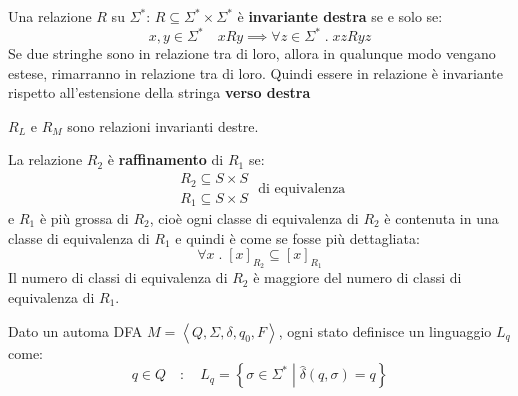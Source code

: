 \documentclass[a4paper]{article}
\begin{document}
\vspace{1em}
\noindent
\begin{definition}
  Una relazione \( R \) su \( \Sigma^* \): \( R \subseteq \Sigma^* \times \Sigma^* \) 
  è \textbf{invariante destra} se e solo se:
  \[
    x,y \in \Sigma^* \quad xRy \implies \forall z \in \Sigma^* \;.\; xz R yz
  \] 
  Se due stringhe sono in relazione tra di loro, allora in qualunque modo vengano
  estese, rimarranno in relazione tra di loro.
  Quindi essere in relazione è invariante rispetto all'estensione della stringa
  \textbf{verso destra}

  \vspace{1em}
  \noindent
  \( R_L \) e \( R_M \) sono relazioni invarianti destre.
\end{definition}

\begin{definition}[Raffinamento]
  La relazione \( R_2 \) è \textbf{raffinamento} di \( R_1 \) se:
  \[
    \begin{array}{ll}
      R_2 \subseteq S \times S \\
      R_1 \subseteq S \times S
    \end{array}
    \text{ di equivalenza}
  \] 
  e \( R_1 \) è più grossa di \( R_2 \), cioè ogni classe di equivalenza di \( R_2 \)
  è contenuta in una classe di equivalenza di \( R_1 \) e quindi è come se fosse
  più dettagliata:
  \[
    \forall x \;.\; [x]_{R_2} \subseteq [x]_{R_1}
  \] 
  Il numero di classi di equivalenza di \( R_2 \) è maggiore del numero di classi
  di equivalenza di \( R_1 \).
\end{definition}

\begin{definition}
  Dato un automa DFA \( M = \left< Q, \Sigma, \delta, q_0, F \right> \),
  ogni stato definisce un linguaggio \( L_q \) come:
  \[
    q \in Q \quad : \quad L_q = \left\{ \sigma \in \Sigma^* \;\left|\; \hat{\delta}(q, \sigma) = q \right. \right\}
  \] 
\end{definition}
\end{document}
